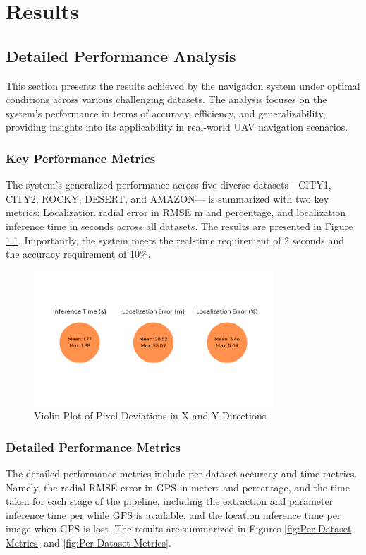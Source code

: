 
\chapter{Results}

\section{Detailed Performance Analysis}

This section presents the results achieved by the navigation system under optimal conditions across various challenging datasets. The analysis focuses on the system's performance in terms of accuracy, efficiency, and generalizability, providing insights into its applicability in real-world UAV navigation scenarios.



\subsection{Key Performance Metrics}

The system's generalized performance across five diverse datasets—CITY1, CITY2, ROCKY, DESERT, and AMAZON— is summarized with two key metrics: Localization radial error in RMSE m and percentage, and localization inference time in seconds across all datasets. The results are presented in Figure \ref{fig:Key Metrics}. Importantly, the system meets the real-time requirement of 2 seconds and the accuracy requirement of 10\%. 

\begin{figure}[H]
    \centering
    \includegraphics[width=0.8\textwidth]{Chapter 5/RESULTPLOTS/key metrics/Metrics_Raw.png}
    \caption{Violin Plot of Pixel Deviations in X and Y Directions}
    \label{fig:Key Metrics}
\end{figure}

\subsection{Detailed Performance Metrics}
The detailed performance metrics include per dataset accuracy and time metrics. Namely, the radial RMSE error in GPS in meters and percentage, and the time taken for each stage of the pipeline, including the extraction and parameter inference time per while GPS is available, and the location inference time per image when GPS is lost. The results are summarized in Figures \ref{fig:Per Dataset Metrics} and \ref{fig:Per Dataset Metrics}. 


